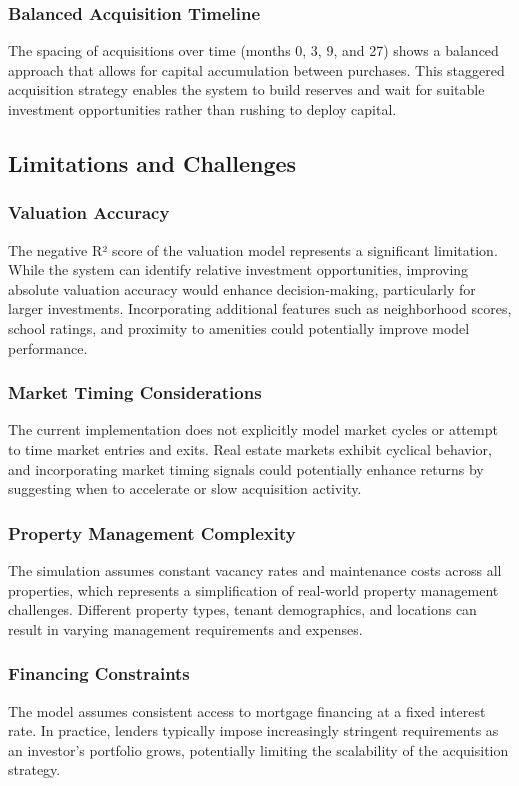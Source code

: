 \documentclass[conference]{IEEEtran}
\begin{document}
\subsubsection{Balanced Acquisition Timeline}
The spacing of acquisitions over time (months 0, 3, 9, and 27) shows a balanced approach that allows for capital accumulation between purchases. This staggered acquisition strategy enables the system to build reserves and wait for suitable investment opportunities rather than rushing to deploy capital.

\subsection{Limitations and Challenges}

\subsubsection{Valuation Accuracy}
The negative R² score of the valuation model represents a significant limitation. While the system can identify relative investment opportunities, improving absolute valuation accuracy would enhance decision-making, particularly for larger investments. Incorporating additional features such as neighborhood scores, school ratings, and proximity to amenities could potentially improve model performance.

\subsubsection{Market Timing Considerations}
The current implementation does not explicitly model market cycles or attempt to time market entries and exits. Real estate markets exhibit cyclical behavior, and incorporating market timing signals could potentially enhance returns by suggesting when to accelerate or slow acquisition activity.

\subsubsection{Property Management Complexity}
The simulation assumes constant vacancy rates and maintenance costs across all properties, which represents a simplification of real-world property management challenges. Different property types, tenant demographics, and locations can result in varying management requirements and expenses.

\subsubsection{Financing Constraints}
The model assumes consistent access to mortgage financing at a fixed interest rate. In practice, lenders typically impose increasingly stringent requirements as an investor's portfolio grows, potentially limiting the scalability of the acquisition strategy.
\end{document}
